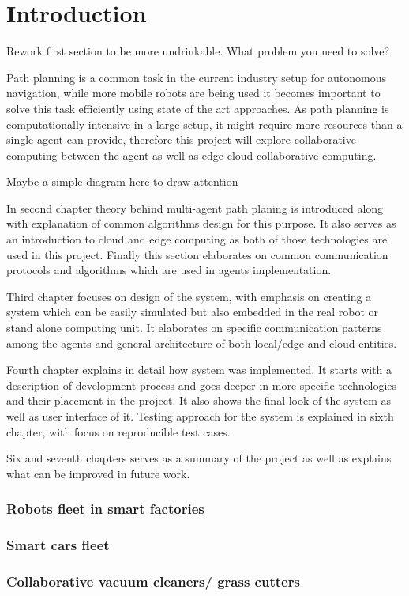 \chapter{Introduction}
{\color{red}Rework first section to be more undrinkable. What problem you need to solve? }

Path planning is a common task in the current industry setup for autonomous navigation, while more mobile robots are being used it becomes important to solve this task efficiently using state of the art approaches. As path planning is computationally intensive in a large setup, it might require more resources than a single agent can provide, therefore this project will explore collaborative computing between the agent as well as edge-cloud collaborative computing.

{\color{red}Maybe a simple diagram here to draw attention}


In second chapter theory behind multi-agent path planing is introduced along with explanation of common algorithms design for this purpose. It also serves as an introduction to cloud and edge computing as both of those technologies are used in this project. Finally this section elaborates on common communication protocols and algorithms which are used in agents implementation.

Third chapter focuses on design of the system, with emphasis on creating a system which can be easily simulated but also embedded in the real robot or stand alone computing unit. It elaborates on specific communication patterns among the agents and general architecture of both local/edge and cloud entities.

Fourth chapter explains in detail how system was implemented. It starts with a description of development process and goes deeper in more specific technologies and their placement in the project. It also shows the final look of the system as well as user interface of it. Testing approach for the system is explained in sixth chapter, with focus on reproducible test cases.

Six and  seventh chapters serves as a summary of the project as well as explains what can be improved in future work.

\subsection{Robots fleet in smart factories}

\subsection{Smart cars fleet}

\subsection{Collaborative vacuum cleaners/ grass cutters}